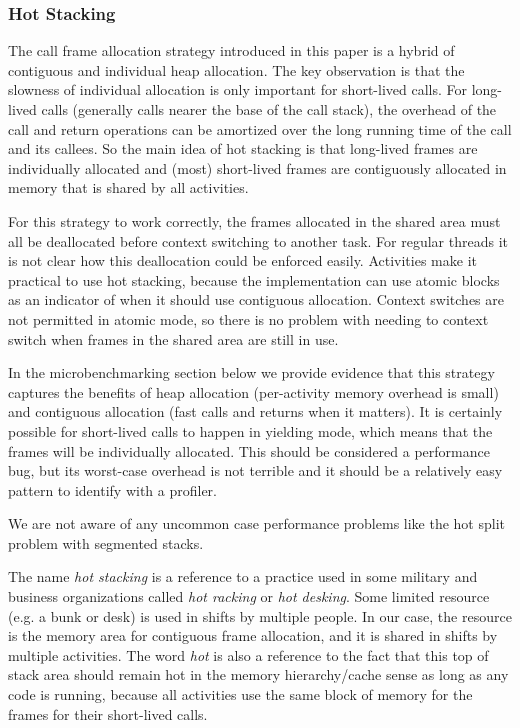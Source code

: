 \documentclass[a4paper,UKenglish,cleveref, autoref]{lipics-v2019}
\begin{document}
\subsubsection{Hot Stacking}

The call frame allocation strategy introduced in this paper is a hybrid of contiguous and individual heap allocation.
The key observation is that the slowness of individual allocation is only important for short-lived calls.
For long-lived calls (generally calls nearer the base of the call stack), the overhead of the call and return operations can be amortized over the long running time of the call and its callees.
So the main idea of hot stacking is that long-lived frames are individually allocated and (most) short-lived frames are contiguously allocated in memory that is shared by all activities.

For this strategy to work correctly, the frames allocated in the shared area must all be deallocated before context switching to another task.
For regular threads it is not clear how this deallocation could be enforced easily.
Activities make it practical to use hot stacking, because the implementation can use atomic blocks as an indicator of when it should use contiguous allocation.
Context switches are not permitted in atomic mode, so there is no problem with needing to context switch when frames in the shared area are still in use.

In the microbenchmarking section below we provide evidence that this strategy captures the benefits of heap allocation (per-activity memory overhead is small) and contiguous allocation (fast calls and returns when it matters).
It is certainly possible for short-lived calls to happen in yielding mode, which means that the frames will be individually allocated.
This should be considered a performance bug, but its worst-case overhead is not terrible and it should be a relatively easy pattern to identify with a profiler.

We are not aware of any uncommon case performance problems like the hot split problem with segmented stacks.

The name \emph{hot stacking} is a reference to a practice used in some military and business organizations called \emph{hot racking} or \emph{hot desking}.
Some limited resource (e.g. a bunk or desk) is used in shifts by multiple people.
In our case, the resource is the memory area for contiguous frame allocation, and it is shared in shifts by multiple activities.
The word \emph{hot} is also a reference to the fact that this top of stack area should remain hot in the memory hierarchy/cache sense as long as any code is running, because all activities use the same block of memory for the frames for their short-lived calls.
\end{document}
